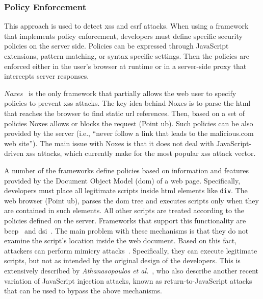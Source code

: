 \documentclass[conference]{IEEEtran}
\begin{document}
\subsubsection{Policy Enforcement}
\label{sec:policy}

This approach is used to detect {\sc xss} and {\sc csrf} attacks. When
using a framework that implements policy enforcement, developers must
define specific security policies on the server side. Policies can be
expressed through JavaScript extensions, pattern matching, or syntax
specific settings. Then the policies are enforced either in the user's
browser at runtime or in a server-side proxy that intercepts server
responses.

{\it Noxes}~\cite{KKVJ06,KJKV09} is the only
framework that partially allows the web
user to specify policies to prevent {\sc xss} attacks.
The key idea behind Noxes is to parse
the {\sc html} that reaches the browser to
find static {\sc url} references. Then, based on
a set of policies Noxes allows or blocks
the request (Point {\sc ub}). Such policies
can be also provided by the server (i.e., ``never
follow a link that leads to the malicious.com
web site''). The main issue with Noxes is that
it does not deal with JavaScript-driven {\sc xss}
attacks, which currently make for the most popular
{\sc xss} attack vector.

A number of the frameworks define policies based on information and
features provided by the Document Object Model ({\sc dom}) of a web
page. Specifically, developers must place all legitimate scripts
inside {\sc html} elements like {\tt div}. The web browser (Point {\sc
  ub}), parses the {\sc dom} tree and executes scripts only when they
are contained in such elements. All other scripts are treated
according to the policies defined on the server. Frameworks that
support this functionality are {\sc beep}~\cite{TNH07} and {\sc
  dsi}~\cite{NSS06}. The main problem with these mechanisms is that
they do not examine the script's location inside the web document.
Based on this fact, attackers can perform mimicry attacks~\cite{WS02}.
Specifically, they can execute legitimate scripts, but not as intended
by the original design of the developers. This is extensively
described by {\it Athanasopoulos et al.}~\cite{APKLM10}, who also describe
another recent variation of JavaScript injection attacks, known as
return-to-JavaScript attacks that can be used to bypass the above
mechanisms.
\end{document}
